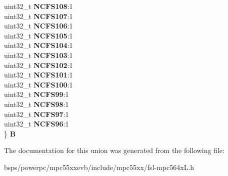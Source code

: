 \begin{DoxyCompactItemize}
\begin{tabbing}
\>uint32\_t {\bfseries NCFS108}:1\\
\>uint32\_t {\bfseries NCFS107}:1\\
\>uint32\_t {\bfseries NCFS106}:1\\
\>uint32\_t {\bfseries NCFS105}:1\\
\>uint32\_t {\bfseries NCFS104}:1\\
\>uint32\_t {\bfseries NCFS103}:1\\
\>uint32\_t {\bfseries NCFS102}:1\\
\>uint32\_t {\bfseries NCFS101}:1\\
\>uint32\_t {\bfseries NCFS100}:1\\
\>uint32\_t {\bfseries NCFS99}:1\\
\>uint32\_t {\bfseries NCFS98}:1\\
\>uint32\_t {\bfseries NCFS97}:1\\
\>uint32\_t {\bfseries NCFS96}:1\\
\} {\bfseries B}\\

\end{tabbing}\end{DoxyCompactItemize}


The documentation for this union was generated from the following file\+:\begin{DoxyCompactItemize}
\item 
bsps/powerpc/mpc55xxevb/include/mpc55xx/fsl-\/mpc564x\+L.\+h\end{DoxyCompactItemize}
